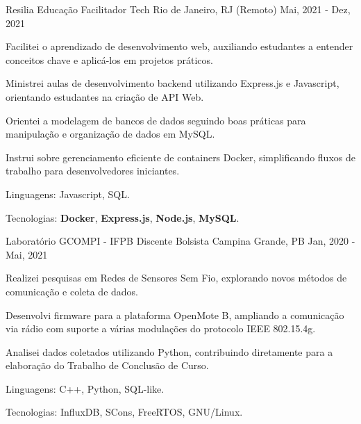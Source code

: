 \begin{cventries}
  \cventry
  {Resilia Educação} %
  {Facilitador Tech} %
  {Rio de Janeiro, RJ (Remoto)} %
  {Mai, 2021 - Dez, 2021} %
  {
    \begin{cvitems} %
      \item {Facilitei o aprendizado de desenvolvimento web, auxiliando estudantes a entender conceitos chave e aplicá-los em projetos práticos.}
      \item {Ministrei aulas de desenvolvimento backend utilizando Express.js e Javascript, orientando estudantes na criação de API Web.}
      \item {Orientei a modelagem de bancos de dados seguindo boas práticas para manipulação e organização de dados em MySQL.}
      \item {Instrui sobre gerenciamento eficiente de containers Docker, simplificando fluxos de trabalho para desenvolvedores iniciantes.}
      \item {Linguagens: Javascript, SQL.}
      \item {Tecnologias: \textbf{Docker},  \textbf{Express.js},  \textbf{Node.js},  \textbf{MySQL}.}
    \end{cvitems}
  }

  \cventry
  {Laboratório GCOMPI - IFPB} %
  {Discente Bolsista} %
  {Campina Grande, PB} %
  {Jan, 2020 - Mai, 2021} %
  {
    \begin{cvitems} %
      \item {Realizei pesquisas em Redes de Sensores Sem Fio, explorando novos métodos de comunicação e coleta de dados.}
      \item {Desenvolvi firmware para a plataforma OpenMote B, ampliando a comunicação via rádio com suporte a várias modulações do protocolo IEEE 802.15.4g.}
      \item {Analisei dados coletados utilizando Python, contribuindo diretamente para a elaboração do Trabalho de Conclusão de Curso.}
      \item {Linguagens: C++, Python, SQL-like.}
      \item {Tecnologias: InfluxDB, SCons, FreeRTOS, GNU/Linux.}
    \end{cvitems}
  }
\end{cventries}
